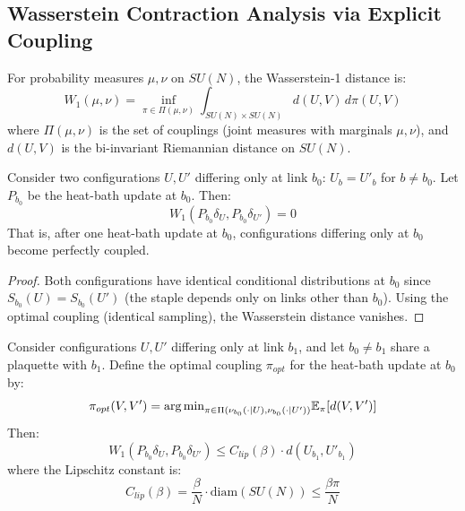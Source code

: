 \subsection{Wasserstein Contraction Analysis via Explicit Coupling}

\begin{definition}
For probability measures $\mu, \nu$ on $SU(N)$, the Wasserstein-1 distance is:
\begin{equation}
    W_1(\mu, \nu) = \inf_{\pi \in \Pi(\mu, \nu)} \int_{SU(N) \times SU(N)} d(U, V) \, d\pi(U, V)
\end{equation}
where $\Pi(\mu, \nu)$ is the set of couplings (joint measures with marginals $\mu, \nu$), and $d(U, V)$ is the bi-invariant Riemannian distance on $SU(N)$.
\end{definition}

\begin{proposition}\label{prop:single_link_contraction}
Consider two configurations $U, U'$ differing only at link $b_0$: $U_b = U'_b$ for $b \neq b_0$. Let $P_{b_0}$ be the heat-bath update at $b_0$. Then:
\begin{equation}
    W_1(P_{b_0} \delta_U, P_{b_0} \delta_{U'}) = 0
\end{equation}
That is, after one heat-bath update at $b_0$, configurations differing only at $b_0$ become perfectly coupled.
\end{proposition}

\begin{proof}
Both configurations have identical conditional distributions at $b_0$ since $S_{b_0}(U) = S_{b_0}(U')$ (the staple depends only on links other than $b_0$). Using the optimal coupling (identical sampling), the Wasserstein distance vanishes.
\end{proof}

\begin{proposition}\label{prop:neighbor_propagation}
Consider configurations $U, U'$ differing only at link $b_1$, and let $b_0 \neq b_1$ share a plaquette with $b_1$. Define the optimal coupling $\pi_{opt}$ for the heat-bath update at $b_0$ by:
\begin{equation}
    \pi_{opt}(V, V') = \text{arg\,min}_{\pi \in \Pi(\nu_{b_0}(\cdot | U), \nu_{b_0}(\cdot | U'))} \mathbb{E}_\pi[d(V, V')]
\end{equation}
Then:
\begin{equation}
    W_1(P_{b_0} \delta_U, P_{b_0} \delta_{U'}) \leq C_{lip}(\beta) \cdot d(U_{b_1}, U'_{b_1})
\end{equation}
where the Lipschitz constant is:
\begin{equation}
    C_{lip}(\beta) = \frac{\beta}{N} \cdot \text{diam}(SU(N)) \leq \frac{\beta \pi}{N}
\end{equation}
\end{proposition}

